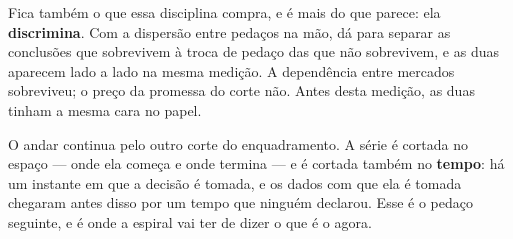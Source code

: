 Fica também o que essa disciplina compra, e é mais do que parece: ela \textbf{discrimina}. Com a
dispersão entre pedaços na mão, dá para separar as conclusões que sobrevivem à troca de pedaço das
que não sobrevivem, e as duas aparecem lado a lado na mesma medição. A dependência entre mercados
sobreviveu; o preço da promessa do corte não. Antes desta medição, as duas tinham a mesma cara no
papel.

O andar continua pelo outro corte do enquadramento. A série é cortada no espaço --- onde ela começa e
onde termina --- e é cortada também no \textbf{tempo}: há um instante em que a decisão é tomada, e os
dados com que ela é tomada chegaram antes disso por um tempo que ninguém declarou. Esse é o pedaço
seguinte, e é onde a espiral vai ter de dizer o que é o agora.
